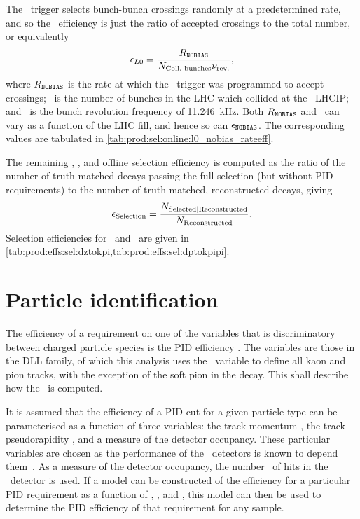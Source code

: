 The \lzero\ trigger selects bunch-bunch crossings randomly at a predetermined 
rate, and so the \lzero\ efficiency is just the ratio of accepted crossings to 
the total number, or equivalently
\begin{equation}
  \eff_{\lzero} = \frac{%
    R_{\nobias}
  }{%
    \ncollbunches\revfreq
  },
  \label{eqn:prod:effs:sel:l0}
\end{equation}
where $R_{\texttt{NOBIAS}}$ is the rate at which the \lzero\ trigger was programmed to 
accept crossings; \ncollbunches\ is the number of bunches in the \ac{LHC} which 
collided at the \lhcb\ \acl{LHCIP}; and \revfreq\ is the bunch revolution 
frequency of \SI{11.246}{\kilo\hertz}.
Both $R_{\texttt{NOBIAS}}$ and \ncollbunches\ can vary as a function of the \ac{LHC} 
fill, and hence so can $\epsilon_{\texttt{NOBIAS}}$.
The corresponding values are tabulated in 
\cref{tab:prod:sel:online:l0_nobias_rateeff}.

The remaining \hltone, \hlttwo, and offline selection efficiency is computed as 
the ratio of the number of truth-matched decays passing the full selection (but 
without \ac{PID} requirements) to the number of truth-matched, reconstructed 
decays, giving
\begin{equation}
  \effselection = \frac{%
    N_{\text{Selected}|\text{Reconstructed}}
  }{%
    N_{\text{Reconstructed}}
  }.
  \label{eqn:prod:effs:sel:l0}
\end{equation}
Selection efficiencies for \DzToKpi\ and \DpToKpipi\ are given in 
\cref{tab:prod:effs:sel:dztokpi,tab:prod:effs:sel:dptokpipi}.

\section{Particle identification}
\label{chap:prod:effs:pid}

The efficiency of a requirement on one of the variables that is discriminatory 
between charged particle species is the \ac{PID} efficiency \effpid.
The variables are those in the \acf{DLL} family, of which this analysis uses 
the \dllkpi\ variable to define all kaon and pion tracks, with the exception of 
the soft pion in the \DstToDzpi decay.
This  shall describe how the \effpid\ is computed.

It is assumed that the efficiency of a \ac{PID} cut for a given particle type 
can be parameterised as a function of three variables: the track momentum 
\ptot, the track pseudorapidity \Eta, and a measure of the detector occupancy.
These particular variables are chosen as the performance of the \rich\ 
detectors is known to depend them~\cite{Adinolfi:2012qfa}.
As a measure of the detector occupancy, the number \nspd\ of hits in the \spd\ 
detector is used.
If a model can be constructed of the efficiency for a particular \ac{PID} 
requirement as a function of \ptot, \Eta, and \nspd, this model can then be 
used to determine the \ac{PID} efficiency of that requirement for any sample.

